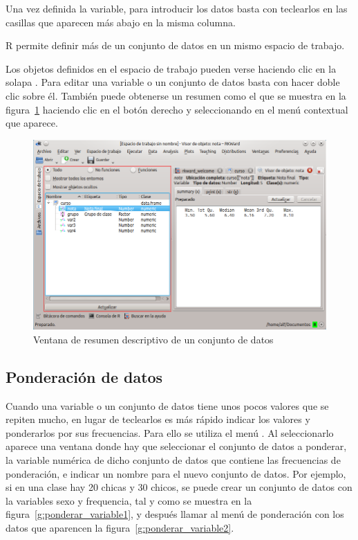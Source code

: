 Una vez definida la variable, para introducir los datos basta con teclearlos en las casillas que aparecen más abajo en
la misma columna.

R permite definir más de un conjunto de datos en un mismo espacio de trabajo.

Los objetos definidos en el espacio de trabajo pueden verse haciendo clic en la solapa .
Para editar una variable o un conjunto de datos basta con hacer doble clic sobre él.
También puede obtenerse un resumen como el que se muestra en la figura~\ref{g:resumen_datos} haciendo clic en el botón
derecho y seleccionando  en el menú contextual que aparece.

\begin{figure}[htp]
\begin{center}
  \includegraphics[scale=0.6]{introduccion_r/img/resumen_datos}
  \caption{Ventana de resumen descriptivo de un conjunto de datos}
  \label{g:resumen_datos}
\end{center}
\end{figure}

\subsection{Ponderación de datos}
Cuando una variable o un conjunto de datos tiene unos pocos valores que se repiten mucho, en lugar de teclearlos es más
rápido indicar los valores y ponderarlos por sus frecuencias.
Para ello se utiliza el menú .
Al seleccionarlo aparece una ventana donde hay que seleccionar el conjunto de datos a ponderar, la variable numérica de
dicho conjunto de datos que contiene las frecuencias de ponderación, e indicar un nombre para el nuevo conjunto de datos.
Por ejemplo, si en una clase hay 20 chicas y 30 chicos, se puede crear un conjunto de datos con la variables sexo y
frequencia, tal y como se muestra en la figura~\ref{g:ponderar_variable1}, y después llamar al menú de ponderación con
los datos que aparencen la figura~\ref{g:ponderar_variable2}.

